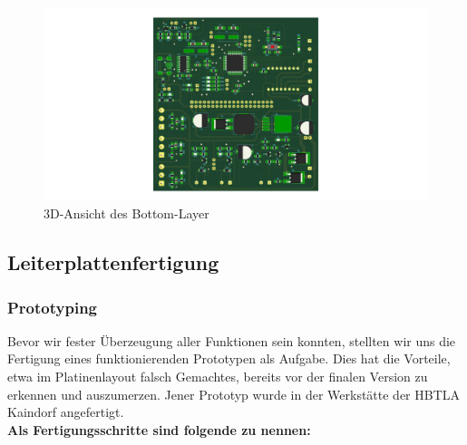 \begin{figure}[hb]
    \includegraphics[scale=0.24]{fig/elektro/PlatineBot.jpg}
    \caption{3D-Ansicht des Bottom-Layer}
\end{figure}

\newpage
\subsection{Leiterplattenfertigung}

\subsubsection{Prototyping}

Bevor wir fester Überzeugung aller Funktionen sein konnten, stellten wir uns die Fertigung eines funktionierenden Prototypen als Aufgabe.
Dies hat die Vorteile, etwa im Platinenlayout falsch Gemachtes, bereits vor der finalen Version zu erkennen und auszumerzen.
Jener Prototyp wurde in der Werkstätte der HBTLA Kaindorf angefertigt. \\

\textbf{Als Fertigungsschritte sind folgende zu nennen:}

